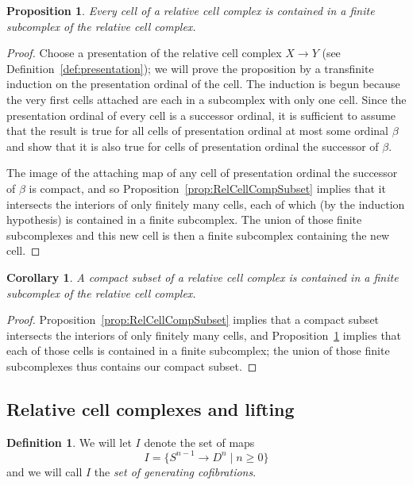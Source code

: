 \documentclass{amsart}
\numberwithin{equation}{section}
\theoremstyle{slplain}
\newtheorem{cor}[equation]{Corollary}
\newtheorem{prop}[equation]{Proposition}
\theoremstyle{definition}
\newtheorem{defn}[equation]{Definition} %
\theoremstyle{remark}
\newcommand{\propref}{Proposition~\ref}
\newcommand{\defref}{Definition~\ref}
\newcommand{\suchthat}{\mid}
\begin{document}
\begin{prop}
  \label{prop:SubCount}
  Every cell of a relative cell complex is contained in a finite
  subcomplex of the relative cell complex.
\end{prop}

\begin{proof}
  Choose a presentation of the relative cell complex $X \to Y$ (see
  \defref{def:presentation}); we will prove the proposition by a
  transfinite induction on the presentation ordinal of the cell.  The
  induction is begun because the very first cells attached are each in
  a subcomplex with only one cell.  Since the presentation ordinal of
  every cell is a successor ordinal, it is sufficient to assume that
  the result is true for all cells of presentation ordinal at most
  some ordinal $\beta$ and show that it is also true for cells of
  presentation ordinal the successor of $\beta$.

  The image of the attaching map of any cell of presentation ordinal
  the successor of $\beta$ is compact, and so
  \propref{prop:RelCellCompSubset} implies that it intersects the
  interiors of only finitely many cells, each of which (by the
  induction hypothesis) is contained in a finite subcomplex.  The
  union of those finite subcomplexes and this new cell is then a
  finite subcomplex containing the new cell.
\end{proof}


\begin{cor}
  \label{cor:CellGenFiniteSubcmp}
  A compact subset of a relative cell complex is contained in a finite
  subcomplex of the relative cell complex.
\end{cor}

\begin{proof}
  \propref{prop:RelCellCompSubset} implies that a compact subset
  intersects the interiors of only finitely many cells, and
  \propref{prop:SubCount} implies that each of those cells is
  contained in a finite subcomplex; the union of those finite
  subcomplexes thus contains our compact subset.
\end{proof}

\subsection{Relative cell complexes and lifting}
\label{sec:ClCmpLift}

\begin{defn}
  \label{def:gc}
  We will let $I$ denote the set of maps
  \begin{displaymath}
    I = \bigl\{S^{n-1} \to D^{n} \suchthat n \ge 0\bigr\}
  \end{displaymath}
  and we will call $I$ the \emph{set of generating cofibrations}.
\end{defn}
\end{document}
